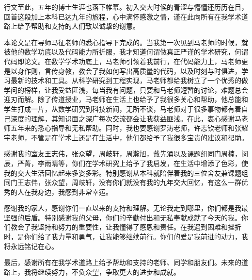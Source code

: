 \begin{acknowledgements}
    行文至此，五年的博士生涯也落下帷幕。初入交大时候的青涩与懵懂还历历在目，回首这段加上本科已达九年的旅程，心中满怀感激之情，谨在此向所有在我学术道路上给予帮助和支持的人们致以诚挚的谢意。

    本论文是在导师马征老师的悉心指导下完成的。当我第一次见到马老师的时候，就被他的数学功底以及代码能力所折服，我才知道何谓做真正严谨的学术研究，何谓代码即论文。在数学学术功底上，马老师引领着我前行，在代码能力上，马老师更是以身作则，言传身教，教会了我如何写出高质量的代码，以及时刻与时俱进，学习最新的技术和工具。从科学研究到工程实现，马老师都给我树立了一个优秀的做学问的榜样，让我受益匪浅，每当我有问题，只要和马老师短暂的讨论，难题总会迎刃而解。除了传道授业，马老师在生活上也给予了我很多关心和帮助，他总能和学生打成一片，从数学研究到科技新闻，无所不谈，马老师对于很多事物都有着自己深度的理解，其知识面之深广每次交流都会让我获益匪浅。在此，衷心感谢马老师五年来的悉心指导和无私帮助。同时，我也要感谢罗涛老师，许志钦老师和张耀宇老师，不管是在学术上还是在生活中，他们都给予了我很多宝贵的建议和帮助。

    感谢我的室友王志伟，张众望，周岐轩，周瀚旭，戴先涌以及课题组同门周楠，闵辰，严菁，李雨晴等，你们在学术研究上给予了我启发，在生活中增添了色彩，使我的交大生活回忆起来多姿多彩。特别感谢从本科就陪伴着我的三位舍友兼课题组同门王志伟，张众望，周岐轩，没有你们就没有我的九年交大回忆，有这么一群优秀的人在我身边，我感到非常幸运。

    感谢我的家人，感谢你们一直以来的支持和理解。无论我走到哪里，你们都是我最坚强的后盾。特别感谢我的父母，你们的辛勤付出和无私奉献成就了今天的我。你们教会了我坚持和努力的重要性，让我懂得了感恩和责任。在我遇到困难和挫折时，是你们给了我力量和勇气，让我能够继续前行。你们的爱是我前进的动力，我将永远铭记在心。

    最后，感谢所有在我学术道路上给予帮助和支持的老师、同学和朋友们。未来的道路上，我将继续努力，不负众望，争取更大的进步和成就。

\end{acknowledgements}